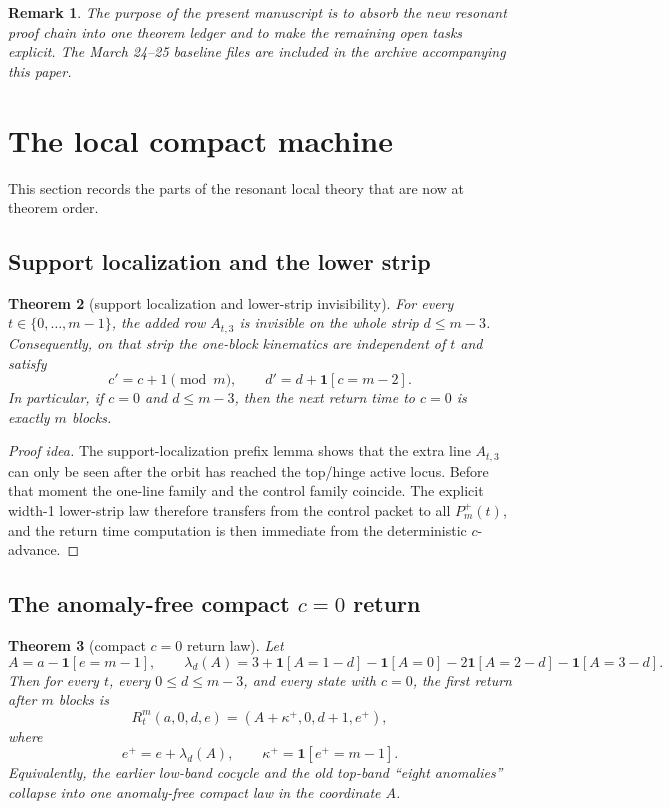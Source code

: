 \documentclass[11pt]{article}
\newtheorem{theorem}{Theorem}[section]
\newtheorem{remark}[theorem]{Remark}
\newcommand{\1}{\mathbf 1}
\begin{document}
\begin{remark}
The purpose of the present manuscript is to absorb the \emph{new} resonant proof chain into one theorem ledger and to make the remaining open tasks explicit.
The March 24--25 baseline files are included in the archive accompanying this paper.
\end{remark}

\section{The local compact machine}

This section records the parts of the resonant local theory that are now at theorem order.

\subsection{Support localization and the lower strip}

\begin{theorem}[support localization and lower-strip invisibility]
For every \(t\in\{0,\dots,m-1\}\), the added row \(A_{t,3}\) is invisible on the whole strip \(d\le m-3\).
Consequently, on that strip the one-block kinematics are independent of \(t\) and satisfy
\[
c' = c+1 \pmod m,
\qquad
d' = d+\1[c=m-2].
\]
In particular, if \(c=0\) and \(d\le m-3\), then the next return time to \(c=0\) is exactly \(m\) blocks.
\end{theorem}

\begin{proof}[Proof idea]
The support-localization prefix lemma shows that the extra line \(A_{t,3}\) can only be seen after the orbit has reached the top/hinge active locus.
Before that moment the one-line family and the control family coincide.
The explicit width-1 lower-strip law therefore transfers from the control packet to all \(P_m^+(t)\), and the return time computation is then immediate from the deterministic \(c\)-advance.
\end{proof}

\subsection{The anomaly-free compact \(c=0\) return}

\begin{theorem}[compact \(c=0\) return law]
Let
\[
A=a-\1[e=m-1], \qquad
\lambda_d(A)=3+\1[A=1-d]-\1[A=0]-2\1[A=2-d]-\1[A=3-d].
\]
Then for every \(t\), every \(0\le d\le m-3\), and every state with \(c=0\), the first return after \(m\) blocks is
\[
R_t^m(a,0,d,e)=(A+\kappa^+,0,d+1,e^+),
\]
where
\[
e^+=e+\lambda_d(A), \qquad
\kappa^+=\1[e^+=m-1].
\]
Equivalently, the earlier low-band cocycle and the old top-band ``eight anomalies'' collapse into one anomaly-free compact law in the coordinate \(A\).
\end{theorem}
\end{document}
